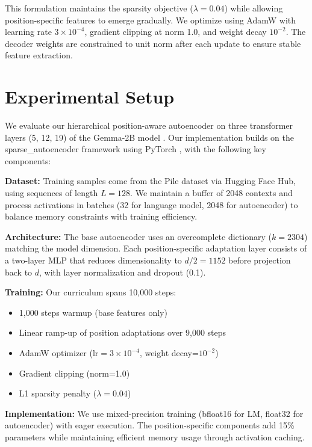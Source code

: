 \documentclass{article} %
\begin{document}
This formulation maintains the sparsity objective ($\lambda=0.04$) while allowing position-specific features to emerge gradually. We optimize using AdamW with learning rate $3\times10^{-4}$, gradient clipping at norm 1.0, and weight decay $10^{-2}$. The decoder weights are constrained to unit norm after each update to ensure stable feature extraction.

\section{Experimental Setup}
\label{sec:experimental}

We evaluate our hierarchical position-aware autoencoder on three transformer layers (5, 12, 19) of the Gemma-2B model \cite{Mesnard2024GemmaOM}. Our implementation builds on the sparse\_autoencoder framework using PyTorch \cite{paszke2019pytorch}, with the following key components:

\textbf{Dataset:} Training samples come from the Pile dataset via Hugging Face Hub, using sequences of length $L=128$. We maintain a buffer of 2048 contexts and process activations in batches (32 for language model, 2048 for autoencoder) to balance memory constraints with training efficiency.

\textbf{Architecture:} The base autoencoder uses an overcomplete dictionary ($k=2304$) matching the model dimension. Each position-specific adaptation layer consists of a two-layer MLP that reduces dimensionality to $d/2=1152$ before projection back to $d$, with layer normalization and dropout (0.1).

\textbf{Training:} Our curriculum spans 10,000 steps:
\begin{itemize}
    \item 1,000 steps warmup (base features only)
    \item Linear ramp-up of position adaptations over 9,000 steps
    \item AdamW optimizer ($\text{lr}=3\times10^{-4}$, weight decay=$10^{-2}$)
    \item Gradient clipping (norm=1.0)
    \item L1 sparsity penalty ($\lambda=0.04$)
\end{itemize}

\textbf{Implementation:} We use mixed-precision training (bfloat16 for LM, float32 for autoencoder) with eager execution. The position-specific components add 15\% parameters while maintaining efficient memory usage through activation caching.
\end{document}
